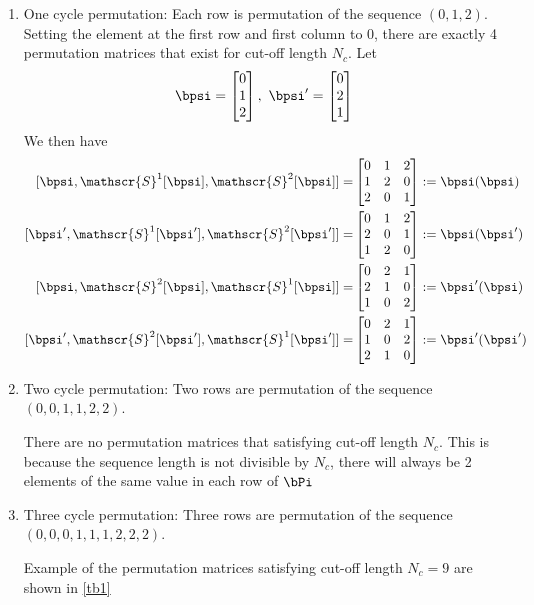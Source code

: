 \documentclass[11pt, oneside, dvipdfmx]{book}
\begin{document}
\begin{enumerate}
	\item One cycle permutation: Each row is permutation of the sequence $(0,1,2)$. Setting the element at the first row and first column to $0$, there are exactly 4 permutation matrices that exist for cut-off length $N_c$.
	Let
	\begin{equation*}
	\bpsi=\begin{bmatrix} 0\cr 1\cr 2\cr \end{bmatrix},~
	\bpsi'=\begin{bmatrix} 0\cr 2\cr 1\cr \end{bmatrix}
	\end{equation*}
We then have 
	\begin{equation}
	\begin{split}
	[\bpsi,\mathscr{S}^1[\bpsi],\mathscr{S}^2[\bpsi]]=
	&
	\begin{bmatrix}
	0 & 1 & 2\cr
	1 & 2 & 0\cr
	2 & 0 & 1
	\end{bmatrix}:=\bpsi(\bpsi) \\
	[\bpsi',\mathscr{S}^1[\bpsi'],\mathscr{S}^2[\bpsi']]=
	&
	\begin{bmatrix}
	0 & 1 & 2\cr
	2 & 0 & 1\cr
	1 & 2 & 0
	\end{bmatrix}:=\bpsi(\bpsi')\\
	[\bpsi,\mathscr{S}^2[\bpsi],\mathscr{S}^1[\bpsi]]=
	&
	\begin{bmatrix}
	0 & 2 & 1\cr
	2 & 1 & 0\cr
	1 & 0 & 2
	\end{bmatrix}:=\bpsi'(\bpsi)\\
	[\bpsi',\mathscr{S}^2[\bpsi'],\mathscr{S}^1[\bpsi']]=
	&
	\begin{bmatrix}
	0 & 2 & 1\cr
	1 & 0 & 2\cr
	2 & 1 & 0
	\end{bmatrix}:=\bpsi'(\bpsi')\\
	\end{split}
	\end{equation}
	
	
	\item Two cycle permutation: Two rows are permutation of the sequence $(0,0,1,1,2,2)$.
	
	There are no permutation matrices that satisfying cut-off length $N_c $. This is because the sequence length is not divisible by $N_c$, there will always be 2 elements of the same value in each row of $\bPi$
	
	
	\item Three cycle permutation: Three rows are permutation of the sequence$(0,0,0,1,1,1,2,2,2)$. 
	
	Example of the permutation matrices satisfying cut-off length $N_c = 9$ are shown in \ref{tb1}
	
	
\end{enumerate}
\end{document}

